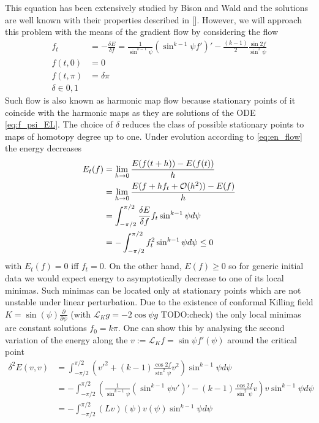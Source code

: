 This equation has been extensively studied by Bison and Wald and the
solutions are well known with their properties described in
[]. However, we will approach this problem with the means of the
gradient flow by considering the flow
\begin{equation}
  \label{eq:en_flow}
  \begin{split}
    f_t&=-\frac{\delta E}{\delta f}=\frac{1}{\sin^{k-1}\psi}\left(\sin^{k-1}\psi
      f'\right)'-\frac{(k-1)}{2}\frac{\sin2f}{\sin^2\psi}\\
    f\left(t,0\right)&=0\\
    f\left(t,\pi\right)&=\delta\pi\\
    \delta\in{0,1}
  \end{split}
\end{equation}
Such flow is also known as harmonic map flow because stationary points
of it coincide with the harmonic maps as they are solutions of the ODE
\eqref{eq:f_psi_EL}. The choice of $\delta$ reduces the class of
possible stationary points to maps of homotopy degree up to one. Under
evolution according to \eqref{eq:en_flow} the energy decreases
\begin{align}
  \label{eq:en_t}
  E_t(f)&=\lim_{h\rightarrow0}\frac{E(f(t+h))-E(f(t))}{h}\\
  &=\lim_{h\rightarrow0}\frac{E(f+h f_t+\mathcal{O}(h^2))-E(f)}{h}\\
  &=\int_{-\pi/2}^{\pi/2}\frac{\delta E}{\delta f}f_t\sin^{k-1}\psi d\psi\\
  &=-\int_{-\pi/2}^{\pi/2}f_t^2\sin^{k-1}\psi d\psi\le0
\end{align}
with $E_t(f)=0$ iff $f_t=0$. On the other hand, $E(f)\ge0$ so for
generic initial data we would expect energy to asymptotically decrease
to one of its local minimas. Such minimas can be located only at
stationary points which are not unstable under linear
perturbation. Due to the existence of conformal Killing field
$K=\sin(\psi)\frac{\partial}{\partial \psi}$ (with $\mathcal{L}_K
g=-2\cos\psi g$ TODO:check) the only local minimas are constant
solutions $f_0=k\pi$. One can show this by analysing the second
variation of the energy along the $v:=\mathcal{L}_K f=\sin\psi
f'(\psi)$ around the critical point
\begin{align}
  \delta^2E(v,v)
  &=\int_{-\pi/2}^{\pi/2}
  \left(
    v'^2+(k-1)\frac{\cos2f}{\sin^2\psi}v^2
  \right)\sin^{k-1}\psi d\psi\\
  &=-\int_{-\pi/2}^{\pi/2}
  \left(\frac{1}{\sin^{k-1}\psi}\left(\sin^{k-1}\psi
      v'\right)'-(k-1)\frac{\cos2f}{\sin^2\psi}v\right)v\sin^{k-1}\psi
  d\psi\\
  &=-\int_{-\pi/2}^{\pi/2}(Lv)(\psi)v(\psi)\sin^{k-1}\psi d\psi
\end{align}
